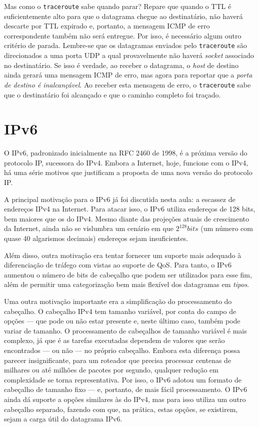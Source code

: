\documentclass{article}
\begin{document}
Mas como o \texttt{traceroute} sabe quando parar? Repare que quando o TTL é suficientemente alto para que o datagrama chegue ao destinatário, não haverá descarte por TTL expirado e, portanto, a mensagem ICMP de erro correspondente também não será entregue. Por isso, é necessário algum outro critério de parada. Lembre-se que os datagramas enviados pelo \texttt{traceroute} são direcionados a uma porta UDP a qual provavelmente não haverá \textit{socket} associado no destinatário. Se isso é verdade, ao receber o datagrama, o \textit{host} de destino ainda gerará uma mensagem ICMP de erro, mas agora para reportar que a \textit{porta de destino é inalcançável}. Ao receber esta mensagem de erro, o \texttt{traceroute} sabe que o destinatário foi alcançado e que o caminho completo foi traçado.

\section{IPv6}

O IPv6, padronizado inicialmente na RFC 2460 de 1998, é a próxima versão do protocolo IP, sucessora do IPv4. Embora a Internet, hoje, funcione com o IPv4, há uma série motivos que justificam a proposta de uma nova versão do protocolo IP.

A principal motivação para o IPv6 já foi discutida nesta aula: a escassez de endereços IPv4 na Internet. Para atacar isso, o IPv6 utiliza endereços de 128 bits, bem maiores que os do IPv4. Mesmo diante das projeções atuais de crescimento da Internet, ainda não se vislumbra um cenário em que $2^{128} bits$ (um número com quase 40 algarismos decimais) endereços sejam insuficientes. 

Além disso, outra motivação era tentar fornecer um suporte mais adequado à diferenciação de tráfego com vistas ao suporte de QoS. Para tanto, o IPv6 aumentou o número de bits de cabeçalho que podem ser utilizados para esse fim, além de permitir uma categorização bem mais flexível dos datagramas em \textit{tipos}.

Uma outra motivação importante era a simplificação do processamento do cabeçalho. O cabeçalho IPv4 tem tamanho variável, por conta do campo de opções --- que pode ou não estar presente e, neste último caso, também pode variar de tamanho. O processamento de cabeçalhos de tamanho variável é mais complexo, já que é as tarefas executadas dependem de valores que serão encontrados --- ou não --- no próprio cabeçalho. Embora esta diferença possa parecer insignificante, para um roteador que precisa processar centenas de milhares ou até milhões de pacotes por segundo, qualquer redução em complexidade se torna representativa. Por isso, o IPv6 adotou um formato de cabeçalho de tamanho fixo --- e, portanto, de mais fácil processamento. O IPv6 ainda dá suporte a opções similares às do IPv4, mas para isso utiliza um outro cabeçalho separado, fazendo com que, na prática, estas opções, se existirem, sejam a carga útil do datagrama IPv6.
\end{document}
